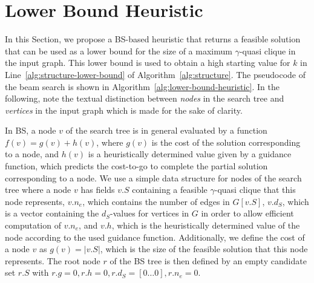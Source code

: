 \documentclass[draft,final]{vutinfth} %
\begin{document}
\section{Lower Bound Heuristic}\label{sec:lower-bound-heuristic}

In this Section, we propose a BS-based heuristic that returns a feasible solution that can be used as a lower bound for the size of a maximum $\gamma$-quasi clique in the input graph. This lower bound is used to obtain a high starting value for $k$ in Line~\ref{alg:structure-lower-bound} of Algorithm~\ref{alg:structure}. 
The pseudocode of the beam search is shown in Algorithm~\ref{alg:lower-bound-heuristic}. 
In the following, note the textual distinction between \emph{nodes} in the search tree and \emph{vertices} in the input graph which is made for the sake of clarity. 

In BS, a node $v$ of the search tree is in general evaluated by a function $f(v) = g(v) + h(v)$, where $g(v)$ is the cost of the solution corresponding to a node, and $h(v)$ is a heuristically determined value given by a guidance function, which predicts the cost-to-go to complete the partial solution corresponding to a node. 
We use a simple data structure for nodes of the search tree where a node $v$ has fields $v.S$ containing a feasible $\gamma$-quasi clique that this node represents, $v.n_e$, which contains the number of edges in $G[v.S]$, $v.d_S$, which is a vector containing the $d_S$-values for vertices in $G$ in order to allow efficient computation of $v.n_e$, and $v.h$, which is the heuristically determined value of the node according to the used guidance function.
Additionally, we define the cost of a node $v$ as $g(v) = |v.S|$, which is the size of the feasible solution that this node represents.  
The root node $r$ of the BS tree is then defined by an empty candidate set $r.S$ with $r.g=0, r.h=0, r.d_S = [0 \dots 0], r.n_e = 0$. 
\end{document}
